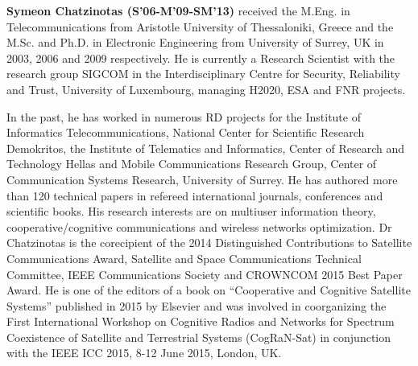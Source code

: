 \documentclass[journal, twocolumn]{IEEEtran}
\begin{document}
\begin{IEEEbiography}
{\textbf{Symeon Chatzinotas (S'06-M'09-SM'13)}} received the M.Eng. in Telecommunications from
Aristotle University of Thessaloniki, Greece and the
M.Sc. and Ph.D. in Electronic Engineering from
University of Surrey, UK in 2003, 2006 and 2009
respectively. He is currently a Research Scientist with
the research group SIGCOM in the Interdisciplinary
Centre for Security, Reliability and Trust, University
of Luxembourg, managing H2020, ESA and FNR
projects.

In the past, he has worked in numerous RD
projects for the Institute of Informatics Telecommunications,
National Center for Scientific Research Demokritos, the Institute of
Telematics and Informatics, Center of Research and Technology Hellas and
Mobile Communications Research Group, Center of Communication Systems
Research, University of Surrey. He has authored more than 120 technical
papers in refereed international journals, conferences and scientific books. His
research interests are on multiuser information theory, cooperative/cognitive
communications and wireless networks optimization. Dr Chatzinotas is the corecipient
of the 2014 Distinguished Contributions to Satellite Communications
Award, Satellite and Space Communications Technical Committee, IEEE
Communications Society and CROWNCOM 2015 Best Paper Award. He is one of the editors of a book on ``Cooperative
and Cognitive Satellite Systems'' published in 2015 by Elsevier and was involved in coorganizing
the First International Workshop on Cognitive Radios and Networks
for Spectrum Coexistence of Satellite and Terrestrial Systems (CogRaN-Sat)
in conjunction with the IEEE ICC 2015, 8-12 June 2015, London, UK.
\end{IEEEbiography}
\end{document}
